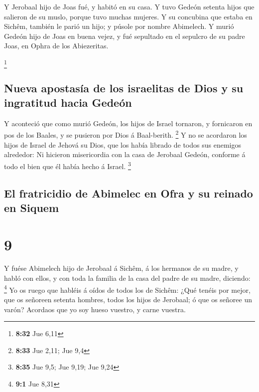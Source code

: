  Y Jerobaal hijo de Joas fué, y habitó en su casa.
 Y tuvo Gedeón setenta hijos que salieron de su muslo,
porque tuvo muchas mujeres.  Y su concubina que estaba en
Sichêm, también le parió un hijo; y púsole por nombre Abimelech.
 Y murió Gedeón hijo de Joas en buena vejez, y fué
sepultado en el sepulcro de su padre Joas, en Ophra de los Abiezeritas.

\footnote{\textbf{8:32} Jue 6,11}

\hypertarget{nueva-apostasuxeda-de-los-israelitas-de-dios-y-su-ingratitud-hacia-gedeuxf3n}{%
\subsection{Nueva apostasía de los israelitas de Dios y su ingratitud
hacia
Gedeón}\label{nueva-apostasuxeda-de-los-israelitas-de-dios-y-su-ingratitud-hacia-gedeuxf3n}}

 Y aconteció que como murió Gedeón, los hijos de Israel
tornaron, y fornicaron en pos de los Baales, y se pusieron por Dios á
Baal-berith. \footnote{\textbf{8:33} Jue 2,11; Jue 9,4} 
Y no se acordaron los hijos de Israel de Jehová su Dios, que los había
librado de todos sus enemigos alrededor:  Ni hicieron
misericordia con la casa de Jerobaal Gedeón, conforme á todo el bien que
él había hecho á Israel. \footnote{\textbf{8:35} Jue 9,5; Jue 9,19; Jue
  9,24}

\hypertarget{el-fratricidio-de-abimelec-en-ofra-y-su-reinado-en-siquem}{%
\subsection{El fratricidio de Abimelec en Ofra y su reinado en
Siquem}\label{el-fratricidio-de-abimelec-en-ofra-y-su-reinado-en-siquem}}

\hypertarget{section-8}{%
\section{9}\label{section-8}}

 Y fuése Abimelech hijo de Jerobaal á Sichêm, á los
hermanos de su madre, y habló con ellos, y con toda la familia de la
casa del padre de su madre, diciendo: \footnote{\textbf{9:1} Jue 8,31}
 Yo os ruego que habléis á oídos de todos los de Sichêm:
¿Qué tenéis por mejor, que os señoreen setenta hombres, todos los hijos
de Jerobaal; ó que os señoree un varón? Acordaos que yo soy hueso
vuestro, y carne vuestra.

